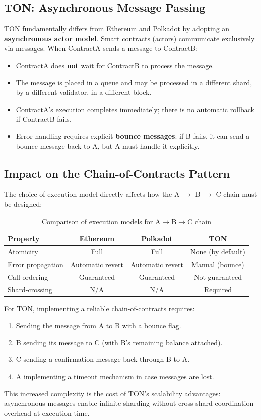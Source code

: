 \subsection{TON: Asynchronous Message Passing}

TON fundamentally differs from Ethereum and Polkadot by adopting an
\textbf{asynchronous actor model}. Smart contracts (actors) communicate
exclusively via messages. When ContractA sends a message to ContractB:

\begin{itemize}
    \item ContractA does \textbf{not} wait for ContractB to process the message.
    \item The message is placed in a queue and may be processed in a different
          shard, by a different validator, in a different block.
    \item ContractA's execution completes immediately; there is no automatic
          rollback if ContractB fails.
    \item Error handling requires explicit \textbf{bounce messages}: if B fails,
          it can send a bounce message back to A, but A must handle it explicitly.
\end{itemize}

\subsection{Impact on the Chain-of-Contracts Pattern}

The choice of execution model directly affects how the A $\to$ B $\to$ C chain
must be designed:

\begin{table}[h]
\centering
\begin{tabular}{|l|c|c|c|}
\hline
\textbf{Property} & \textbf{Ethereum} & \textbf{Polkadot} & \textbf{TON} \\
\hline
Atomicity & Full & Full & None (by default) \\
Error propagation & Automatic revert & Automatic revert & Manual (bounce) \\
Call ordering & Guaranteed & Guaranteed & Not guaranteed \\
Shard-crossing & N/A & N/A & Required \\
\hline
\end{tabular}
\caption{Comparison of execution models for A$\to$B$\to$C chain}
\end{table}

For TON, implementing a reliable chain-of-contracts requires:
\begin{enumerate}
    \item Sending the message from A to B with a bounce flag.
    \item B sending its message to C (with B's remaining balance attached).
    \item C sending a confirmation message back through B to A.
    \item A implementing a timeout mechanism in case messages are lost.
\end{enumerate}

This increased complexity is the cost of TON's scalability advantages:
asynchronous messages enable infinite sharding without cross-shard coordination
overhead at execution time.